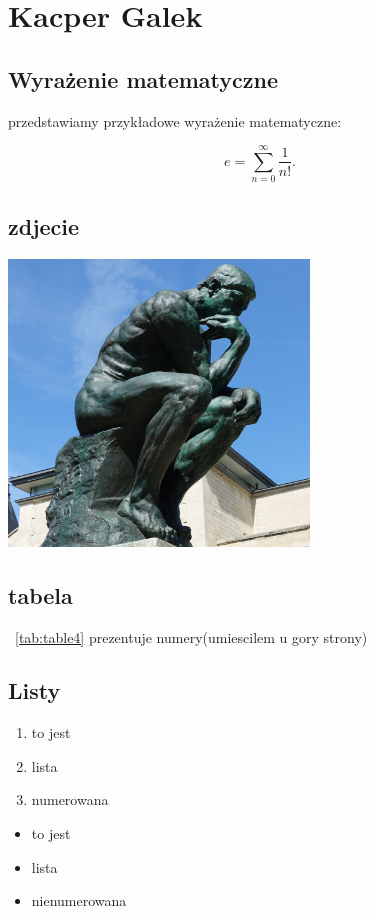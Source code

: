 \newpage
\section{Kacper Galek}
\subsection{Wyrażenie matematyczne}


przedstawiamy przykładowe wyrażenie matematyczne:

$$e=\sum_{n=0}^{\infty} \frac{1}{n!}.$$

\subsection{zdjecie}

\includegraphics[width=0.6\textwidth]{pictures/mysliciel.jpg}

\subsection{tabela}

~\ref{tab:table4} prezentuje numery(umiescilem u gory strony)
 

\subsection{Listy}

\begin{enumerate}
    \item to jest
    \item lista 
    \item numerowana
\end{enumerate}

\begin{itemize}
    \item to jest
    \item lista
    \item nienumerowana
\end{itemize}


